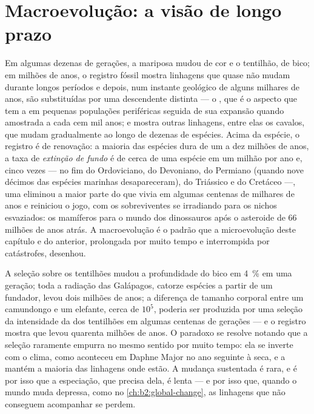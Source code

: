 \section{Macroevolução: a visão de longo prazo}

\begin{proposition}\label{prop:b2:speciation:tempo}
Em algumas dezenas de gerações, a mariposa mudou de cor e o tentilhão,
de bico; em milhões de anos, o registro fóssil mostra linhagens que
quase não mudam durante longos períodos e depois, num instante geológico
de alguns milhares de anos, são substituídas por uma descendente
distinta --- o \emph{}, que é o aspecto que tem a
 em pequenas populações periféricas seguida de
sua expansão quando amostrada a cada cem mil anos; e mostra outras
linhagens, entre elas os cavalos, que mudam gradualmente ao longo de
dezenas de espécies. Acima da espécie, o registro é de renovação: a
maioria das espécies dura de um a dez milhões de anos, a taxa de
\emph{extinção de fundo} é de cerca de uma espécie em um milhão por ano
e, cinco vezes --- no fim do Ordoviciano, do Devoniano, do Permiano
(quando nove décimos das espécies marinhas desapareceram), do Triássico
e do Cretáceo ---, uma \emph{} eliminou a maior parte
do que vivia em algumas centenas de milhares de anos e reiniciou o jogo,
com os sobreviventes se irradiando para os nichos esvaziados: os
mamíferos para o mundo dos dinossauros após o asteroide de 66 milhões de
anos atrás. A macroevolução é o padrão que a microevolução deste
capítulo e do anterior, prolongada por muito tempo e interrompida por
catástrofes, desenhou.
\end{proposition}

\begin{example}\label{ex:b2:speciation:rates}
A seleção sobre os tentilhões mudou a profundidade do bico em
\qty{4}{\%} em uma geração; toda a radiação das Galápagos, catorze
espécies a partir de um fundador, levou dois milhões de anos; a diferença
de tamanho corporal entre um camundongo e um elefante, cerca de $10^{5}$,
poderia ser produzida por uma seleção da intensidade da dos tentilhões
em algumas centenas de gerações --- e o registro mostra que levou
quarenta milhões de anos. O paradoxo se resolve notando que a seleção
raramente empurra no mesmo sentido por muito tempo: ela se inverte com o
clima, como aconteceu em Daphne Major no ano seguinte à seca, e a
 mantém a maioria das linhagens onde estão. A
mudança sustentada é rara, e é por isso que a especiação, que precisa
dela, é lenta --- e por isso que, quando o mundo muda depressa, como no
\cref{ch:b2:global-change}, as linhagens que não conseguem acompanhar se
perdem.
\end{example}

